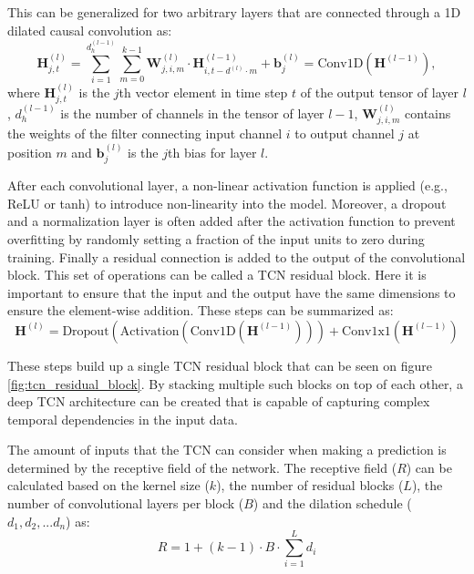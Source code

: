 This can be generalized for two arbitrary layers that are connected through a 1D dilated causal convolution as:
\begin{equation}
    \mathbf{H}^{(l)}_{j, t} = \sum_{i=1}^{d_h^{(l-1)}} \sum_{m=0}^{k-1} \mathbf{W}^{(l)}_{j, i, m} \cdot \mathbf{H}^{(l-1)}_{i, t - d^{(l)} \cdot m} + \mathbf{b}^{(l)}_j = \text{Conv1D}(\mathbf{H}^{(l-1)}),
\end{equation}
where $\mathbf{H}^{(l)}_{j,t}$ is the $j$th vector element in time step $t$ of the output tensor of layer $l$, $d_h^{(l-1)}$ is the number of channels in the tensor of layer $l-1$, $\mathbf{W}^{(l)}_{j,i,m}$ contains the weights of the filter connecting input channel $i$ to output channel $j$ at position $m$ and $\mathbf{b}^{(l)}_j$ is the $j$th bias for layer $l$.

After each convolutional layer, a non-linear activation function is applied (e.g., ReLU or tanh) to introduce non-linearity into the model. Moreover, a dropout and a normalization layer is often added after the activation function to prevent overfitting by randomly setting a fraction of the input units to zero during training. Finally a residual connection is added to the output of the convolutional block. This set of operations can be called a TCN residual block. Here it is important to ensure that the input and the output have the same dimensions to ensure the element-wise addition. These steps can be summarized as:
\begin{equation}
    \mathbf{H}^{(l)} = \text{Dropout}(\text{Activation}(\text{Conv1D}(\mathbf{H}^{(l-1)}))) + \text{Conv1x1}(\mathbf{H}^{(l-1)})
\end{equation}

These steps build up a single TCN residual block that can be seen on figure \ref{fig:tcn_residual_block}. By stacking multiple such blocks on top of each other, a deep TCN architecture can be created that is capable of capturing complex temporal dependencies in the input data. 

The amount of inputs that the TCN can consider when making a prediction is determined by the receptive field of the network. The receptive field ($R$) can be calculated based on the kernel size ($k$), the number of residual blocks ($L$), the number of convolutional layers per block ($B$) and the dilation schedule ($d_1, d_2,...d_n$) as:
\begin{equation}
    R = 1 + (k - 1) \cdot B \cdot \sum_{i=1}^{L} d_i
\end{equation}

